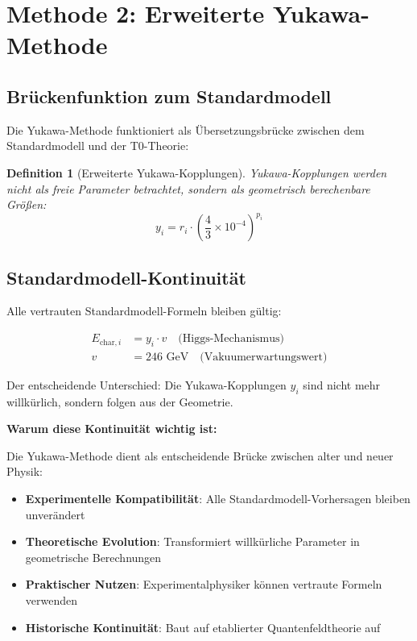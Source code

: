 \documentclass[12pt,a4paper]{article}
\newtheorem{definition}[theorem]{Definition}
\begin{document}
	\section{Methode 2: Erweiterte Yukawa-Methode}
	\label{sec:yukawa_method}
	
	\subsection{Brückenfunktion zum Standardmodell}
	\label{subsec:bridge_function}
	
	Die Yukawa-Methode funktioniert als Übersetzungsbrücke zwischen dem Standardmodell und der T0-Theorie:
	
	\begin{definition}[Erweiterte Yukawa-Kopplungen]
		Yukawa-Kopplungen werden nicht als freie Parameter betrachtet, sondern als geometrisch berechenbare Größen:
		\begin{equation}
			y_i = r_i \cdot \left(\frac{4}{3} \times 10^{-4}\right)^{p_i}
			\label{eq:yukawa_couplings}
		\end{equation}
	\end{definition}
	
	\subsection{Standardmodell-Kontinuität}
	\label{subsec:standard_model_continuity}
	
	Alle vertrauten Standardmodell-Formeln bleiben gültig:
	
	\begin{align}
		E_{\text{char},i} &= y_i \cdot v \quad \text{(Higgs-Mechanismus)} \\
		v &= 246 \text{ GeV} \quad \text{(Vakuumerwartungswert)}
	\end{align}
	
	Der entscheidende Unterschied: Die Yukawa-Kopplungen $y_i$ sind nicht mehr willkürlich, sondern folgen aus der Geometrie.
	
	\textbf{Warum diese Kontinuität wichtig ist:}
	
	Die Yukawa-Methode dient als entscheidende Brücke zwischen alter und neuer Physik:
	
	\begin{itemize}
		\item \textbf{Experimentelle Kompatibilität}: Alle Standardmodell-Vorhersagen bleiben unverändert
		\item \textbf{Theoretische Evolution}: Transformiert willkürliche Parameter in geometrische Berechnungen
		\item \textbf{Praktischer Nutzen}: Experimentalphysiker können vertraute Formeln verwenden
		\item \textbf{Historische Kontinuität}: Baut auf etablierter Quantenfeldtheorie auf
	\end{itemize}
	
\end{document}
